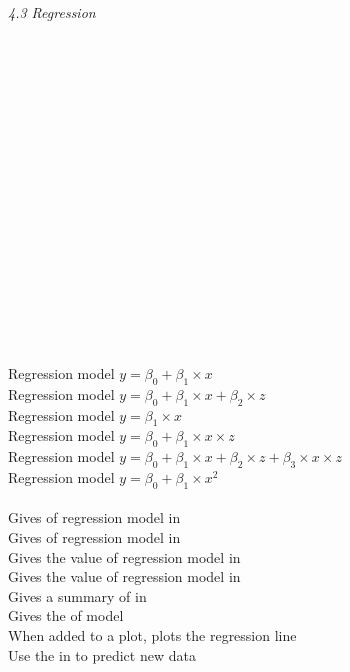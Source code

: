\textit{4.3 Regression} \\
\\
\begin{minipage}[t]{.4\textwidth}
\vspace*{-8pt}
 \\	
 \\	
 \\
 \\
 \\
 \\
\\
 \\ 
 \\  
 \\
 \\
 \\
 \\
 \\
 \\
\end{minipage}
\begin{minipage}[t]{.6\textwidth}
Regression model $y = \beta_0 + \beta_1 \times x$  \\
Regression model $y = \beta_0 + \beta_1 \times x + \beta_2 \times z$  \\
Regression model $y = \beta_1 \times x$  \\
Regression model $y = \beta_0 + \beta_1 \times x \times z$ \\ 
Regression model $y = \beta_0 + \beta_1 \times x + \beta_2 \times z + \beta_3 \times x \times z$ \\
Regression model $y = \beta_0 + \beta_1 \times x^2$ \\
\\
Gives  of regression model in  \\
Gives  of regression model in  \\
Gives the  value of regression model in   \\
Gives the  value of regression model in  \\
Gives a summary of  in   \\
Gives the  of model  \\
When added to a plot, plots the regression line \\
Use the  in  to predict new data \\
\end{minipage}
\vspace*{.5cm}

\clearpage %